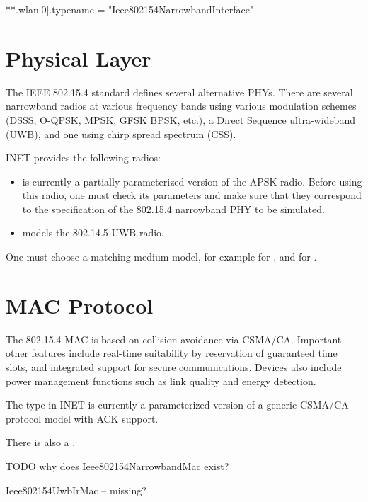 \begin{inifile}
**.wlan[0].typename = "Ieee802154NarrowbandInterface"
\end{inifile}

\section{Physical Layer}
\label{sec:802154:physical-layer}

The IEEE 802.15.4 standard defines several alternative PHYs. There are
several narrowband radios at various frequency bands using various modulation
schemes (DSSS, O-QPSK, MPSK, GFSK BPSK, etc.), a Direct Sequence ultra-wideband
(UWB), and one using chirp spread spectrum (CSS).

INET provides the following radios:

\begin{itemize}
  \item {} is currently a partially
    parameterized version of the APSK radio. Before using this radio,
    one must check its parameters and make sure that they correspond to the
    specification of the 802.15.4 narrowband PHY to be simulated.
  \item {} models the 802.14.5 UWB radio.
\end{itemize}

One must choose a matching medium model, for example
 for ,
and  for
.


\section{MAC Protocol}
\label{sec:802154:mac-protocol}

The 802.15.4 MAC is based on collision avoidance via CSMA/CA. Important other
features include real-time suitability by reservation of guaranteed time slots,
and integrated support for secure communications. Devices also include power
management functions such as link quality and energy detection.

The  type in INET is currently a parameterized
version of a generic CSMA/CA protocol model with ACK support.

There is also a .

TODO why does Ieee802154NarrowbandMac exist?

Ieee802154UwbIrMac -- missing?



